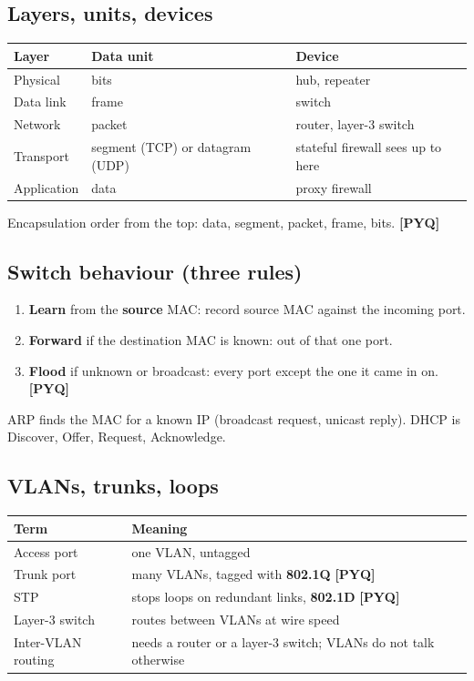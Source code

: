 \documentclass[11pt,a4paper]{article}
\newcommand{\pyq}{\textcolor{ember}{\scriptsize\textbf{[PYQ]}}}
\begin{document}
\subsection{Layers, units, devices}
\begin{center}\small\renewcommand{\arraystretch}{1.18}\setlength{\tabcolsep}{9pt}
\begin{tabularx}{\linewidth}{@{}l>{\raggedright\arraybackslash}X>{\raggedright\arraybackslash}X@{}}
\toprule
\textbf{\color{slate}Layer} & \textbf{\color{slate}Data unit} & \textbf{\color{slate}Device} \\ \midrule
Physical & bits & hub, repeater \\
Data link & frame & switch \\
Network & packet & router, layer-3 switch \\
Transport & segment (TCP) or datagram (UDP) & stateful firewall sees up to here \\
Application & data & proxy firewall \\
\bottomrule
\end{tabularx}\end{center}
Encapsulation order from the top: data, segment, packet, frame, bits. \pyq{}

\subsection{Switch behaviour (three rules)}
\begin{enumerate}
\item \textbf{Learn} from the \textbf{source} MAC: record source MAC against the incoming port.
\item \textbf{Forward} if the destination MAC is known: out of that one port.
\item \textbf{Flood} if unknown or broadcast: every port except the one it came in on. \pyq{}
\end{enumerate}
ARP finds the MAC for a known IP (broadcast request, unicast reply). DHCP is Discover, Offer, Request, Acknowledge.

\subsection{VLANs, trunks, loops}
\begin{center}\small\renewcommand{\arraystretch}{1.18}\setlength{\tabcolsep}{9pt}
\begin{tabularx}{\linewidth}{@{}>{\raggedright\arraybackslash}X>{\raggedright\arraybackslash}X@{}}
\toprule
\textbf{\color{slate}Term} & \textbf{\color{slate}Meaning} \\ \midrule
Access port & one VLAN, untagged \\
Trunk port & many VLANs, tagged with \textbf{802.1Q} \pyq{} \\
STP & stops loops on redundant links, \textbf{802.1D} \pyq{} \\
Layer-3 switch & routes between VLANs at wire speed \\
Inter-VLAN routing & needs a router or a layer-3 switch; VLANs do not talk otherwise \\
\bottomrule
\end{tabularx}\end{center}
\end{document}

